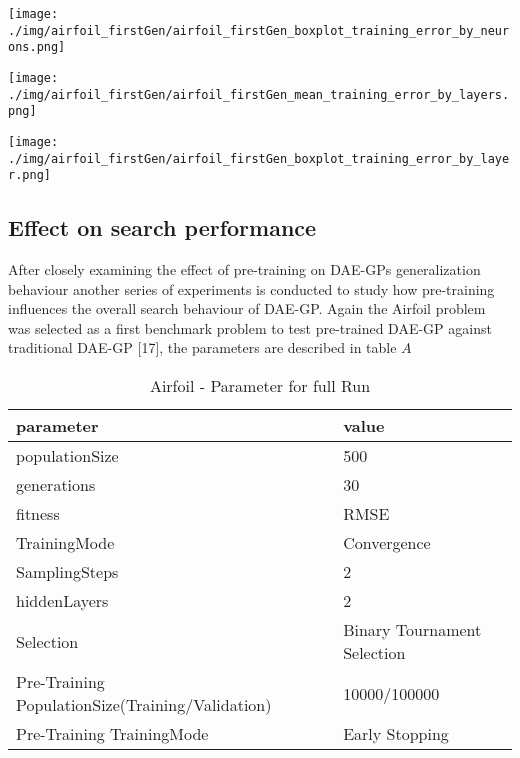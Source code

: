 \documentclass[
  11pt,
]{article}
\let\origfigure\figure
\let\endorigfigure\endfigure
\renewenvironment{figure}[1][2] {
    \expandafter\origfigure\expandafter[H]
} {
    \endorigfigure
}
\begin{document}
\begin{figure}
\centering
\texttt{[image: ./img/airfoil\_firstGen/airfoil\_firstGen\_boxplot\_training\_error\_by\_neurons.png]}
\caption{Airfoil - First Generation final Training Error for variable
number of hidden Neurons}
\end{figure}

\begin{figure}
\centering
\texttt{[image: ./img/airfoil\_firstGen/airfoil\_firstGen\_mean\_training\_error\_by\_layers.png]}
\caption{Airfoil - First Generation Median Training Error for variable
number of hidden Layers}
\end{figure}

\begin{figure}
\centering
\texttt{[image: ./img/airfoil\_firstGen/airfoil\_firstGen\_boxplot\_training\_error\_by\_layer.png]}
\caption{Airfoil - First Generation final Training Error for variable
number of hidden Layers}
\end{figure}

\hypertarget{effect-on-search-performance}{%
\subsection{Effect on search
performance}\label{effect-on-search-performance}}

After closely examining the effect of pre-training on DAE-GPs
generalization behaviour another series of experiments is conducted to
study how pre-training influences the overall search behaviour of
DAE-GP. Again the Airfoil problem was selected as a first benchmark
problem to test pre-trained DAE-GP against traditional DAE-GP {[}17{]},
the parameters are described in table \(A\)

\begin{table}[!h]

\caption{\label{tab:airfoil_fullRun_2hl_maxIndSize_params}Airfoil - Parameter for full Run}
\centering
\begin{tabular}[t]{l|l}
\hline
\textbf{parameter} & \textbf{value}\\
\hline
populationSize & 500\\
\hline
generations & 30\\
\hline
fitness & RMSE\\
\hline
TrainingMode & Convergence\\
\hline
SamplingSteps & 2\\
\hline
hiddenLayers & 2\\
\hline
Selection & Binary Tournament Selection\\
\hline
Pre-Training PopulationSize(Training/Validation) & 10000/100000\\
\hline
Pre-Training TrainingMode & Early Stopping\\
\hline
\end{tabular}
\end{table}
\end{document}
